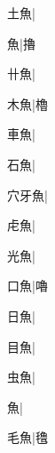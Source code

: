 \begin{multicols}{2}
{{\cjk{}{\cnsym{}　}土魚}\mktsJzrVerticalBar{}{\cjk{}{\cnsym{}　}{\cnsym{}　}{\cnsym{}　}}|{}\par
{魚}\mktsJzrVerticalBar{}{\cjk{}{\cnsym{}　}{\cnsym{}　}{\cnsym{}　}}|{\cjk{}擼}\par
{\cjk{}{\cnsym{}　}卄魚}\mktsJzrVerticalBar{}{\cjk{}{\cnsym{}　}{\cnsym{}　}{\cnsym{}　}}|{}\par
{\cjk{}{\cnsym{}　}木魚}\mktsJzrVerticalBar{}{\cjk{}{\cnsym{}　}{\cnsym{}　}{\cnsym{}　}}|{\cjk{}櫓}\par
{\cjk{}{\cnsym{}　}車魚}\mktsJzrVerticalBar{}{\cjk{}{\cnsym{}　}{\cnsym{}　}{\cnsym{}　}}|{}\par
{\cjk{}{\cnsym{}　}石魚}\mktsJzrVerticalBar{}{\cjk{}{\cnsym{}　}{\cnsym{}　}{\cnsym{}　}}|{}\par
{\cjk{}穴牙魚}\mktsJzrVerticalBar{}{\cjk{}{\cnsym{}　}{\cnsym{}　}{\cnsym{}　}}|{}\par
{\cjk{}{\cnsym{}　}虍魚}\mktsJzrVerticalBar{}{\cjk{}{\cnsym{}　}{\cnsym{}　}{\cnsym{}　}}|{}\par
{\cjk{}{\cnsym{}　}光魚}\mktsJzrVerticalBar{}{\cjk{}{\cnsym{}　}{\cnsym{}　}{\cnsym{}　}}|{}\par
{\cjk{}{\cnsym{}　}口魚}\mktsJzrVerticalBar{}{\cjk{}{\cnsym{}　}{\cnsym{}　}{\cnsym{}　}}|{\cjk{}嚕}\par
{\cjk{}{\cnsym{}　}日魚}\mktsJzrVerticalBar{}{\cjk{}{\cnsym{}　}{\cnsym{}　}{\cnsym{}　}}|{}\par
{\cjk{}{\cnsym{}　}目魚}\mktsJzrVerticalBar{}{\cjk{}{\cnsym{}　}{\cnsym{}　}{\cnsym{}　}}|{}\par
{\cjk{}{\cnsym{}　}虫魚}\mktsJzrVerticalBar{}{\cjk{}{\cnsym{}　}{\cnsym{}　}{\cnsym{}　}}|{}\par
{魚}\mktsJzrVerticalBar{}{\cjk{}{\cnsym{}　}{\cnsym{}　}{\cnsym{}　}}|{}\par
{\cjk{}{\cnsym{}　}毛魚}\mktsJzrVerticalBar{}{\cjk{}{\cnsym{}　}{\cnsym{}　}{\cnsym{}　}}|{\cjk{}氌}\par
}
\end{multicols}
